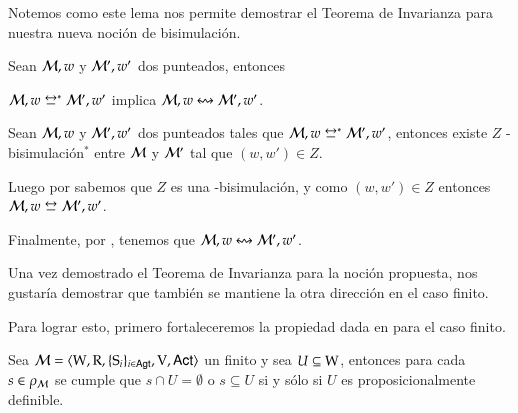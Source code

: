 Notemos como este lema nos permite demostrar el Teorema de Invarianza para nuestra nueva noción de bisimulación.

\begin{teorema}
    Sean $\mathcal{M},w$ y $\mathcal{M}',w'$ dos \ultss punteados, entonces
    \begin{center}
        $\modults,w \bisim^* \modults',w'$ implica $\mathcal{M},w \mathrel{\leftrightsquigarrow} \mathcal{M}',w'$.
    \end{center}
\end{teorema}

\begin{demostracion}
    Sean $\mathcal{M},w$ y $\mathcal{M}',w'$ dos \ultss punteados tales que $\modults,w \bisim^* \modults',w'$, entonces existe $Z$ \KHilogic-bisimulación$^*$
    entre $\mathcal{M}$ y $\mathcal{M}'$ tal que $(w,w') \in Z$.
    
    Luego por  sabemos que $Z$ es una \KHilogic-bisimulación, y como $(w,w') \in Z$ entonces $\modults,w \bisim \modults',w'$.

    Finalmente, por , tenemos que $\mathcal{M},w \mathrel{\leftrightsquigarrow} \mathcal{M}',w'$.
\end{demostracion}

Una vez demostrado el Teorema de Invarianza para la noción propuesta, nos gustaría demostrar que también se mantiene la otra dirección en
el caso finito. 

Para lograr esto, primero fortaleceremos la propiedad dada en  para el caso finito.

\begin{lema}\label{lema:finite-propositionally-definable-lemma}
    Sea $\mathcal{M}=\langle \mathrm{W},\mathrm{R},\{ \mathrm{S}_i \}_{i \in {\rm \sf Agt}},\mathrm{V},{\rm \sf Act} \rangle$ un \ults finito y sea $U \subseteq \mathrm{W}$, entonces
    para cada $s \in \rho_{\mathcal{M}}$ se cumple que $s \cap U = \emptyset$ o $s \subseteq U$ si y sólo si $U$ es proposicionalmente definible.
\end{lema}

